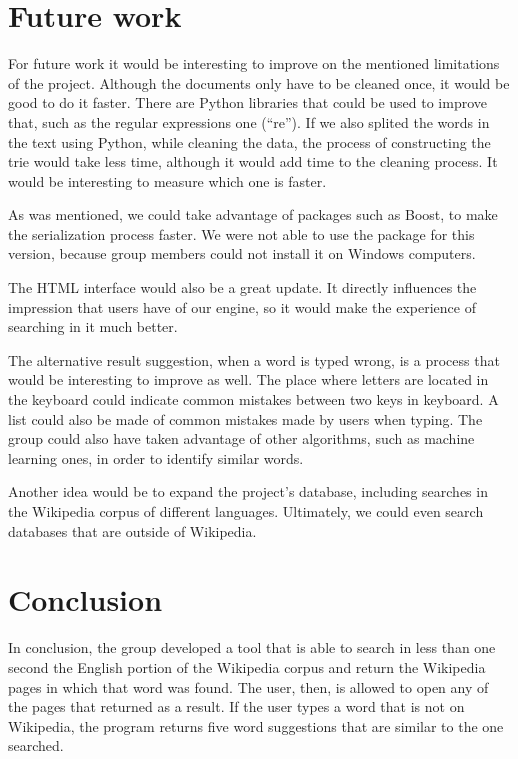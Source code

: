 \documentclass{article}
\begin{document}
\section*{Future work}
For future work it would be interesting to improve on the mentioned limitations of the project. Although the documents only have to be cleaned once, it would be good to do it faster. There are Python libraries that could be used to improve that, such as the regular expressions one (``re''). If we also splited the words in the text using Python, while cleaning the data, the process of constructing the trie would take less time, although it would add time to the cleaning process. It would be interesting to measure which one is faster.

As was mentioned, we could take advantage of packages such as Boost, to make the serialization process faster. We were not able to use the package for this version, because group members could not install it on Windows computers. 

The HTML interface would also be a great update. It directly influences the impression that users have of our engine, so it would make the experience of searching in it much better. 

The alternative result suggestion, when a word is typed wrong, is a process that would be interesting to improve as well. The place where letters are located in the keyboard could indicate common mistakes between two keys in keyboard. A list could also be made of common mistakes made by users when typing. The group could also have taken advantage of other algorithms, such as machine learning ones, in order to identify similar words. 

Another idea would be to expand the project's database, including searches in the Wikipedia corpus of different languages. Ultimately, we could even search databases that are outside of Wikipedia. 

\section*{Conclusion}
In conclusion, the group developed a tool that is able to search in less than one second the English portion of the Wikipedia corpus and return the Wikipedia pages in which that word was found. The user, then, is allowed to open any of the pages that returned as a result. If the user types a word that is not on Wikipedia, the program returns five word suggestions that are similar to the one searched. 
\end{document}
